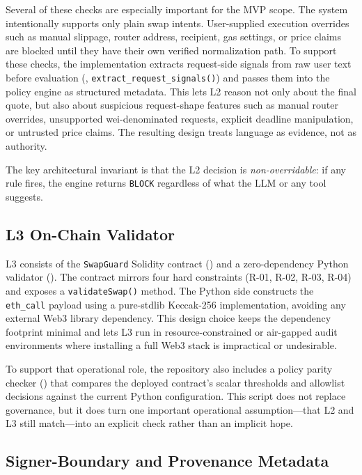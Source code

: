 ﻿\documentclass[conference]{IEEEtran}
\begin{document}
Several of these checks are especially important for the MVP scope. The system
intentionally supports only plain swap intents. User-supplied execution
overrides such as manual slippage, router address, recipient, gas settings, or
price claims are blocked until they have their own verified normalization path.
To support these checks, the implementation extracts request-side signals from
raw user text before evaluation (,
\texttt{extract\_request\_signals()}) and passes them into the policy engine as
structured metadata. This lets L2 reason not only about the final quote, but
also about suspicious request-shape features such as manual router overrides,
unsupported wei-denominated requests, explicit deadline manipulation, or
untrusted price claims. The resulting design treats language as evidence, not
as authority.

The key architectural invariant is that the L2 decision is
\textit{non-overridable}: if any rule fires, the engine returns
\texttt{BLOCK} regardless of what the LLM or any tool suggests.

\subsection{L3 On-Chain Validator}

L3 consists of the \texttt{Swap\allowbreak Guard} Solidity contract
() and a zero-dependency Python validator
(). The contract mirrors four hard
constraints (R-01, R-02, R-03, R-04) and exposes a \texttt{validateSwap()}
method. The Python side constructs the \texttt{eth\_call} payload using a
pure-stdlib Keccak-256 implementation, avoiding any external Web3 library
dependency. This design choice keeps the dependency footprint minimal and lets
L3 run in resource-constrained or air-gapped audit environments where
installing a full Web3 stack is impractical or undesirable.

To support that operational role, the repository also includes a policy parity
checker () that compares the deployed
contract's scalar thresholds and allowlist decisions against the current Python
configuration. This script does not replace governance, but it does turn one
important operational assumption---that L2 and L3 still match---into an
explicit check rather than an implicit hope.

\subsection{Signer-Boundary and Provenance Metadata}
\end{document}
